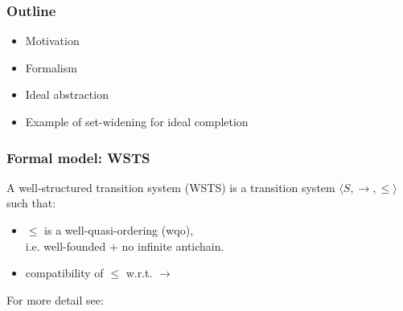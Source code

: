 \documentclass{beamer}
\begin{document}
\begin{frame}
  \frametitle{Outline}
  {\Large
  \begin{itemize}
  \item Motivation
  \end{itemize}
  \begin{itemize}
  \item Formalism
  \end{itemize}
  \begin{itemize}
  \item Ideal abstraction
  \end{itemize}
  \begin{itemize}
  \item Example of set-widening for ideal completion%
  \end{itemize}
  }
\end{frame}



\begin{frame}
  \frametitle{Formal model: WSTS}
  A well-structured transition system (WSTS)
  is a transition system $\langle S, \rightarrow, \leq \rangle$ such that:
  \begin{itemize}
  \item
    $\leq$ is a well-quasi-ordering (wqo),\\
    i.e. well-founded + no infinite antichain.
  \item
    compatibility of $\leq$ w.r.t. $\rightarrow$\\
    \begin{center}
    \end{center}
  \end{itemize}

  For more detail see: \cite{DBLP:journals/tcs/FinkelS01, DBLP:conf/lics/AbdullaCJT96}

\end{frame}
\end{document}
